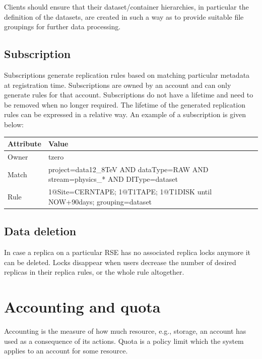 \documentclass{atlasnote}
\begin{document}
Clients should ensure that their dataset/container hierarchies, in particular the definition of the datasets, are created in such a way as to provide suitable file groupings for further data processing.

\subsection{Subscription}
\label{sec:Subscription}

Subscriptions generate replication rules based on matching particular metadata at registration time. Subscriptions are owned by an account and can only generate rules for that account. Subscriptions do not have a lifetime and need to be removed when no longer required. The lifetime of the generated replication rules can be expressed in a relative way. An example of a subscription is given below:

\bigskip

\begin{tabular}{l p{11cm}}
\toprule
\textbf{Attribute} & \textbf{Value} \\
\midrule
Owner & tzero \\
Match & project=data12\_8TeV AND dataType=RAW AND stream=physics\_* AND DIType=dataset \\
Rule & 1@Site=CERNTAPE; 1@T1TAPE; 1@T1DISK until NOW+90days; grouping=dataset \\
\bottomrule
\end{tabular}

\subsection{Data deletion}
\label{sec:Datadeletion}

In case a replica on a particular RSE has no associated replica locks anymore it can be deleted. Locks disappear when users decrease the number of desired replicas in their replica rules, or the whole rule altogether.

\section{Accounting and quota}
\label{overview_Accounting_and_quota:accounting-and-quota}

Accounting is the measure of how much resource, e.g., storage, an account has used as a consequence of its actions. Quota is a policy limit which the system applies to an account for some resource.
\end{document}
